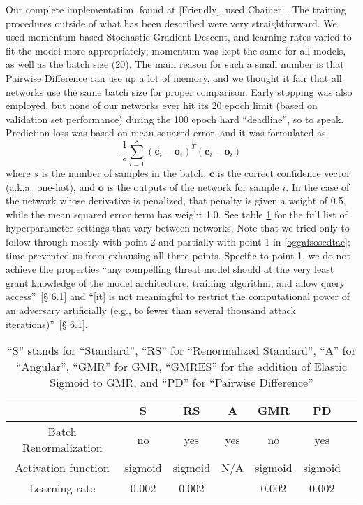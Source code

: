 Our complete implementation, found at \cite{mycode}[Friendly], used Chainer~\cite{tokui2019chainer,
language, 2020NumPy-Array, cupy_learningsys2017}. The training procedures outside of what has been
described were very straightforward. We used momentum-based Stochastic Gradient Descent, and
learning rates varied to fit the model more appropriately; momentum was kept the same for all
models, as well as the batch size (20). The main reason for such a small number is that Pairwise
Difference can use up a lot of memory, and we thought it fair that all networks use the same batch
size for proper comparison. Early stopping was also employed, but none of our networks ever hit its
20 epoch limit (based on validation set performance) during the 100 epoch hard ``deadline'', so to
speak. Prediction loss was based on mean squared error, and it was formulated as
\[
    \frac{1}{s} \sum_{i=1}^{s} (\mathbf{c}_i - \mathbf{o}_i)^T (\mathbf{c}_i - \mathbf{o}_i)
\]
where $s$ is the number of samples in the batch, $\mathbf{c}$ is the correct confidence vector
(a.k.a.\ one-hot), and $\mathbf{o}$ is the outputs of the network for sample $i$. In the case of the
network whose derivative is penalized, that penalty is given a weight of 0.5, while the mean squared
error term has weight 1.0. See table \ref{settings} for the full list of hyperparameter settings
that vary between networks. Note that we tried only to follow through mostly with point 2 and
partially with point 1 in \ref{oggafsoscdtae}; time prevented us from exhausing all three points.
Specific to point 1, we do not achieve the properties ``any compelling threat model should at the
very least grant knowledge of the model architecture, training algorithm, and allow query
access''~\cite{athalye2018obfuscated}[§ 6.1] and ``[it] is not meaningful to restrict the
computational power of an adversary artificially (e.g., to fewer than several thousand attack
iterations)''~\cite{athalye2018obfuscated}[§ 6.1].
\begin{table}[th]
    \begin{center}
        \begin{tabular}{| c | c | c | c | c | c | c |}
            \hline
                                  &     S       &     RS      &   A     &     GMR     &  PD       \\
            \hline
            Batch Renormalization &     no      &     yes     &   yes   &     no      &  yes      \\
            Activation function   &   sigmoid   &   sigmoid   &   N/A   &   sigmoid   &  sigmoid  \\
            Learning rate         &    0.002    &    0.002    &         &    0.002    &  0.002    \\
            \hline
        \end{tabular}
    \end{center}
    \caption{``S'' stands for ``Standard'', ``RS'' for ``Renormalized Standard'', ``A'' for
             ``Angular'', ``GMR'' for GMR, ``GMRES'' for the addition of Elastic Sigmoid to GMR, and
             ``PD'' for ``Pairwise Difference''}
    \label{settings}
\end{table}
